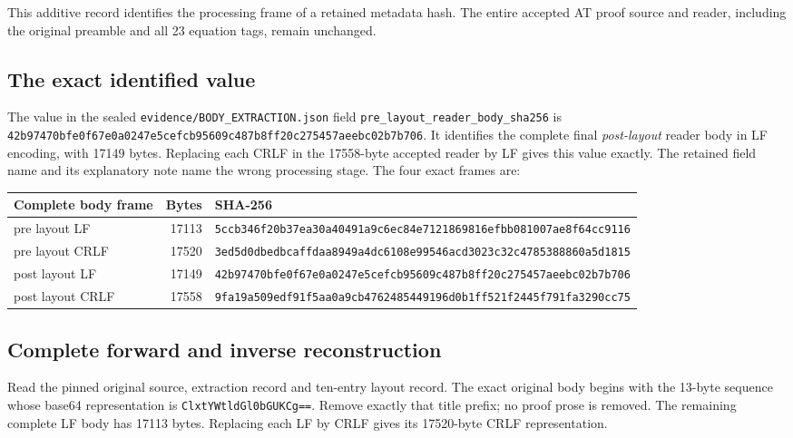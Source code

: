 \documentclass{article}
\begin{document}
\maketitle
\begingroup
\small

This additive record identifies the processing frame of a retained metadata
hash. The entire accepted AT proof source and reader, including the original
preamble and all 23 equation tags, remain unchanged.

\subsection{The exact identified value}
The value in the sealed
\nolinkurl{evidence/BODY_EXTRACTION.json} field
\nolinkurl{pre_layout_reader_body_sha256} is
\nolinkurl{42b97470bfe0f67e0a0247e5cefcb95609c487b8ff20c275457aeebc02b7b706}.
It identifies the complete final \emph{post-layout} reader body in LF
encoding, with 17149 bytes. Replacing each CRLF in the 17558-byte accepted
reader by LF gives this value exactly. The retained field name and its
explanatory note name the wrong processing stage. The four exact frames are:

\begin{longtable}{@{}p{.23\linewidth}r p{.57\linewidth}@{}}
\toprule Complete body frame & Bytes & SHA-256 \\
\midrule
pre layout LF & 17113 & \nolinkurl{5ccb346f20b37ea30a40491a9c6ec84e7121869816efbb081007ae8f64cc9116} \\
pre layout CRLF & 17520 & \nolinkurl{3ed5d0dbedbcaffdaa8949a4dc6108e99546acd3023c32c4785388860a5d1815} \\
post layout LF & 17149 & \nolinkurl{42b97470bfe0f67e0a0247e5cefcb95609c487b8ff20c275457aeebc02b7b706} \\
post layout CRLF & 17558 & \nolinkurl{9fa19a509edf91f5aa0a9cb4762485449196d0b1ff521f2445f791fa3290cc75} \\
\bottomrule
\end{longtable}

\subsection{Complete forward and inverse reconstruction}
Read the pinned original source, extraction record and ten-entry layout
record. The exact original body begins with the 13-byte sequence whose
base64 representation is \nolinkurl{ClxtYWtldGl0bGUKCg==}.
Remove exactly that title prefix; no proof prose is removed.
The remaining complete LF body has 17113 bytes. Replacing each LF by CRLF
gives its 17520-byte CRLF representation.
\end{document}

